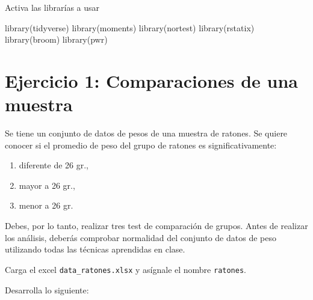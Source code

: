 \documentclass[
]{article}
\newenvironment{Shaded}{}{}
\newcommand{\CommentTok}[1]{\textcolor[rgb]{0.38,0.63,0.69}{\textit{#1}}}
\newcommand{\FunctionTok}[1]{\textcolor[rgb]{0.02,0.16,0.49}{#1}}
\newcommand{\NormalTok}[1]{#1}
\newcommand{\OtherTok}[1]{\textcolor[rgb]{0.00,0.44,0.13}{#1}}
\newcommand{\SpecialCharTok}[1]{\textcolor[rgb]{0.25,0.44,0.63}{#1}}
\newcommand{\StringTok}[1]{\textcolor[rgb]{0.25,0.44,0.63}{#1}}
\begin{document}
Activa las librarías a usar

\begin{Shaded}
\begin{Highlighting}[]
\FunctionTok{library}\NormalTok{(tidyverse)}
\FunctionTok{library}\NormalTok{(moments)}
\FunctionTok{library}\NormalTok{(nortest)}
\FunctionTok{library}\NormalTok{(rstatix)}
\FunctionTok{library}\NormalTok{(broom)}
\FunctionTok{library}\NormalTok{(pwr)}
\end{Highlighting}
\end{Shaded}

\hypertarget{ejercicio-1-comparaciones-de-una-muestra}{%
\section{\texorpdfstring{\textbf{Ejercicio 1: Comparaciones de una
muestra}}{Ejercicio 1: Comparaciones de una muestra}}\label{ejercicio-1-comparaciones-de-una-muestra}}

Se tiene un conjunto de datos de pesos de una muestra de ratones. Se
quiere conocer si el promedio de peso del grupo de ratones es
significativamente:

\begin{enumerate}
\def\labelenumi{\arabic{enumi}.}
\item
  diferente de 26 gr.,
\item
  mayor a 26 gr.,
\item
  menor a 26 gr.
\end{enumerate}

Debes, por lo tanto, realizar tres test de comparación de grupos. Antes
de realizar los análisis, deberás comprobar normalidad del conjunto de
datos de peso utilizando todas las técnicas aprendidas en clase.

Carga el excel \texttt{data\_ratones.xlsx} y asígnale el nombre
\texttt{ratones}.

Desarrolla lo siguiente:

\begin{Shaded}
\end{Shaded}
\end{document}
